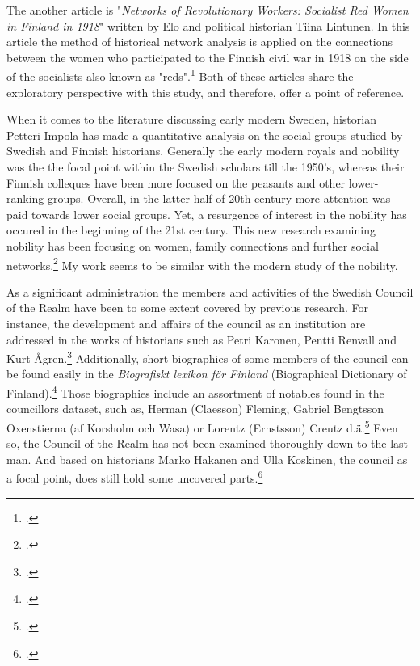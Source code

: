 The another article is "\textit{Networks of Revolutionary Workers: Socialist Red Women in Finland in 1918}" written by Elo and political historian Tiina Lintunen. In this article the method of historical network analysis is applied on the connections between the women who participated to the Finnish civil war in 1918 on the side of the socialists also known as "reds".\footcite[Almost the same article is found in Finnish in the \textit{Historiallinen Aikakauskirja} 116 (2/2018).]{LintunenAndElo2019} Both of these articles share the exploratory perspective with this study, and therefore, offer a point of reference. 

When it comes to the literature discussing early modern Sweden, historian Petteri Impola has made a quantitative analysis on the social groups studied by Swedish and Finnish historians. Generally the early modern royals and nobility was the the focal point within the Swedish scholars till the 1950's, whereas their Finnish colleques have been more focused on the peasants and other lower-ranking groups. Overall, in the latter half of 20th century more attention was paid towards lower social groups. Yet, a resurgence of interest in the nobility has occured in the beginning of the 21st century. This new research examining nobility has been focusing on women, family connections and further social networks.\footcite{impola2024} My work seems to be similar with the modern study of the nobility.

As a significant administration the members and activities of the Swedish Council of the Realm have been to some extent covered by previous research. For instance, the development and affairs of the council as an institution are addressed in the works of historians such as Petri Karonen, Pentti Renvall and Kurt Ågren.\footcites{pSuurvalta}[See e. g. Pentti Renvall "\textit{Keskitetyn hallintolaitoksen kehitys}" in \textit{Suomen kulttuurihistoria. II} (1934) or Kurt Ågren "\textit{Rise and decline of an aristocracy: The Swedish social and political elite in the 17th century}" in the \textit{Scandinavian journal of history} (1976).]{hopesAndFearsCouncil} Additionally, short biographies of some members of the council can be found easily in the \textit{Biografiskt lexikon för Finland} (Biographical Dictionary of Finland).\footcite{blf} Those biographies include an assortment of notables found in the councillors dataset, such as, Herman (Claesson) Fleming, Gabriel Bengtsson Oxenstierna (af Korsholm och Wasa) or Lorentz (Ernstsson) Creutz d.ä.\footcite{blf-list} Even so, the Council of the Realm has not been examined thoroughly down to the last man. And based on historians Marko Hakanen and Ulla Koskinen, the council as a focal point, does still hold some uncovered parts.\footcite[pp. 47-48.]{HakanenAKoskinen2017} 

